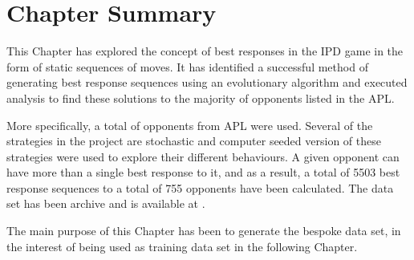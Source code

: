 \section{Chapter Summary}

This Chapter has explored the concept of best responses in the IPD game in the
form of static sequences of moves. It has identified a successful method of
generating best response sequences using an evolutionary algorithm and executed
analysis to find these solutions to the majority of opponents listed in the APL.

More specifically, a total of \numberofstrategiesbestsequences opponents from
APL were used. Several of the strategies in the project are stochastic and
computer seeded version of these strategies were used to explore their different
behaviours. A given opponent can have more than a single best response to it, and
as a result, a total of 5503 best response sequences to a total of 755 opponents
have been calculated. The data set has been archive and is available at
\cite{Glynatsi2020_sequences}.

The main purpose of this Chapter has been to generate the bespoke data set,
in the interest of being used as training data set in the following Chapter.